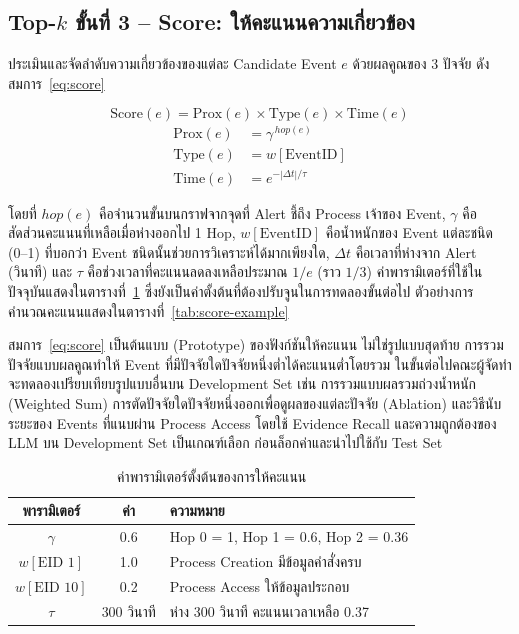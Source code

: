 \subsection{Top-$k$ ขั้นที่ 3 -- Score: ให้คะแนนความเกี่ยวข้อง}
ประเมินและจัดลำดับความเกี่ยวข้องของแต่ละ Candidate Event $e$ ด้วยผลคูณของ 3 ปัจจัย ดังสมการ~\eqref{eq:score}

\begin{equation}\label{eq:score}
\mathrm{Score}(e) = \mathrm{Prox}(e) \times \mathrm{Type}(e) \times \mathrm{Time}(e)
\end{equation}
\begin{align}
\mathrm{Prox}(e) &= \gamma^{\,hop(e)} \\
\mathrm{Type}(e) &= w[\mathrm{EventID}] \\
\mathrm{Time}(e) &= e^{-|\Delta t|/\tau}
\end{align}

\noindent
โดยที่ $hop(e)$ คือจำนวนขั้นบนกราฟจากจุดที่ Alert ชี้ถึง Process เจ้าของ Event,
$\gamma$ คือสัดส่วนคะแนนที่เหลือเมื่อห่างออกไป 1 Hop,
$w[\mathrm{EventID}]$ คือน้ำหนักของ Event แต่ละชนิด (0--1) ที่บอกว่า Event ชนิดนั้นช่วยการวิเคราะห์ได้มากเพียงใด,
$\Delta t$ คือเวลาที่ห่างจาก Alert (วินาที) และ $\tau$ คือช่วงเวลาที่คะแนนลดลงเหลือประมาณ $1/e$ (ราว $1/3$)
ค่าพารามิเตอร์ที่ใช้ในปัจจุบันแสดงในตารางที่~\ref{tab:score-param}
ซึ่งยังเป็นค่าตั้งต้นที่ต้องปรับจูนในการทดลองขั้นต่อไป
ตัวอย่างการคำนวณคะแนนแสดงในตารางที่~\ref{tab:score-example}

สมการ~\eqref{eq:score} เป็นต้นแบบ (Prototype) ของฟังก์ชันให้คะแนน ไม่ใช่รูปแบบสุดท้าย
การรวมปัจจัยแบบผลคูณทำให้ Event ที่มีปัจจัยใดปัจจัยหนึ่งต่ำได้คะแนนต่ำโดยรวม
ในขั้นต่อไปคณะผู้จัดทำจะทดลองเปรียบเทียบรูปแบบอื่นบน Development Set
เช่น การรวมแบบผลรวมถ่วงน้ำหนัก (Weighted Sum) การตัดปัจจัยใดปัจจัยหนึ่งออกเพื่อดูผลของแต่ละปัจจัย (Ablation)
และวิธีนับระยะของ Events ที่แนบผ่าน Process Access
โดยใช้ Evidence Recall และความถูกต้องของ LLM บน Development Set เป็นเกณฑ์เลือก
ก่อนล็อกค่าและนำไปใช้กับ Test Set

\begin{table}[ht]
  \centering
  \caption{ค่าพารามิเตอร์ตั้งต้นของการให้คะแนน}
  \label{tab:score-param}
  \begin{tabular}{|c|c|l|}
    \hline
    \textbf{พารามิเตอร์} & \textbf{ค่า} & \textbf{ความหมาย} \\ \hline
    $\gamma$ & 0.6 & Hop 0 = 1, Hop 1 = 0.6, Hop 2 = 0.36 \\ \hline
    $w[\text{EID 1}]$ & 1.0 & Process Creation มีข้อมูลคำสั่งครบ \\ \hline
    $w[\text{EID 10}]$ & 0.2 & Process Access ให้ข้อมูลประกอบ \\ \hline
    $\tau$ & 300 วินาที & ห่าง 300 วินาที คะแนนเวลาเหลือ 0.37 \\ \hline
  \end{tabular}
\end{table}

